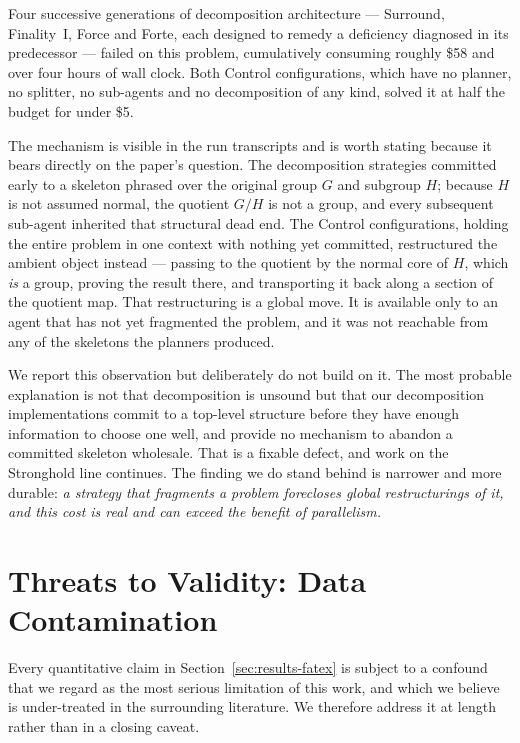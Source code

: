 \documentclass[12pt, a4paper]{article}
\begin{document}
Four successive generations of decomposition architecture --- Surround,
Finality~I, Force and Forte, each designed to remedy a deficiency diagnosed
in its predecessor --- failed on this problem, cumulatively consuming
roughly \$58 and over four hours of wall clock. Both Control
configurations, which have no planner, no splitter, no sub-agents and no
decomposition of any kind, solved it at half the budget for under \$5.

The mechanism is visible in the run transcripts and is worth stating because
it bears directly on the paper's question. The decomposition strategies
committed early to a skeleton phrased over the original group $G$ and
subgroup $H$; because $H$ is not assumed normal, the quotient $G/H$ is not a
group, and every subsequent sub-agent inherited that structural dead end.
The Control configurations, holding the entire problem in one context with
nothing yet committed, restructured the ambient object instead --- passing to
the quotient by the normal core of $H$, which \emph{is} a group, proving the
result there, and transporting it back along a section of the quotient map.
That restructuring is a global move. It is available only to an agent that
has not yet fragmented the problem, and it was not reachable from any of the
skeletons the planners produced.

We report this observation but deliberately do not build on it. The most
probable explanation is not that decomposition is unsound but that our
decomposition implementations commit to a top-level structure before they
have enough information to choose one well, and provide no mechanism to
abandon a committed skeleton wholesale. That is a fixable defect, and work
on the Stronghold line continues. The finding we do stand behind is
narrower and more durable: \emph{a strategy that fragments a problem
forecloses global restructurings of it, and this cost is real and can
exceed the benefit of parallelism.}

\section{Threats to Validity: Data Contamination}
\label{sec:contamination}

Every quantitative claim in Section~\ref{sec:results-fatex} is subject to a
confound that we regard as the most serious limitation of this work, and
which we believe is under-treated in the surrounding literature. We
therefore address it at length rather than in a closing caveat.
\end{document}
